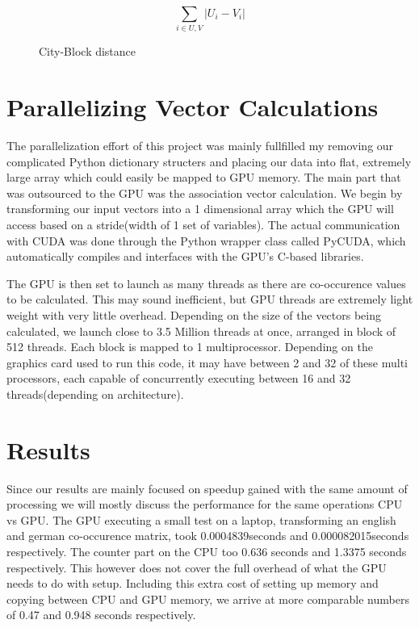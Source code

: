 \documentclass[12pt]{article}
\begin{document}
\begin{figure}
$$\sum_{i\in U,V} |U_i - V_i| $$
\caption{City-Block distance}
  \label{cityblock}
\end{figure}

\section{Parallelizing Vector Calculations}

The parallelization effort of this project was mainly fullfilled my removing our complicated Python dictionary structers and placing our data into flat, extremely large array which could easily be mapped to GPU memory. The main part that was outsourced to the GPU was the association vector calculation. We begin by transforming our input vectors into a 1 dimensional array which the GPU will access based on a stride(width of 1 set of variables). The actual communication with CUDA was done through the Python wrapper class called PyCUDA, which automatically compiles and interfaces with the GPU's C-based libraries.

The GPU is then set to launch as many threads as there are co-occurence values to be calculated. This may sound inefficient, but GPU threads are extremely light weight with very little overhead. Depending on the size of the vectors being calculated, we launch close to 3.5 Million threads at once, arranged in block of 512 threads. Each block is mapped to 1 multiprocessor. Depending on the graphics card used to run this code, it may have between 2 and 32 of these multi processors, each capable of concurrently executing between 16 and 32 threads(depending on architecture). 

\section{Results}

Since our results are mainly focused on speedup gained with the same amount of processing we will mostly discuss the performance for the same operations CPU vs GPU. The GPU executing a small test on a laptop, transforming an english and german co-occurence matrix, took 0.0004839seconds and 0.000082015seconds respectively. The counter part on the CPU too 0.636 seconds and 1.3375 seconds respectively. This however does not cover the full overhead of what the GPU needs to do with setup. Including this extra cost of setting up memory and copying between CPU and GPU memory, we arrive at more comparable numbers of 0.47 and 0.948 seconds respectively. 
\end{document}
